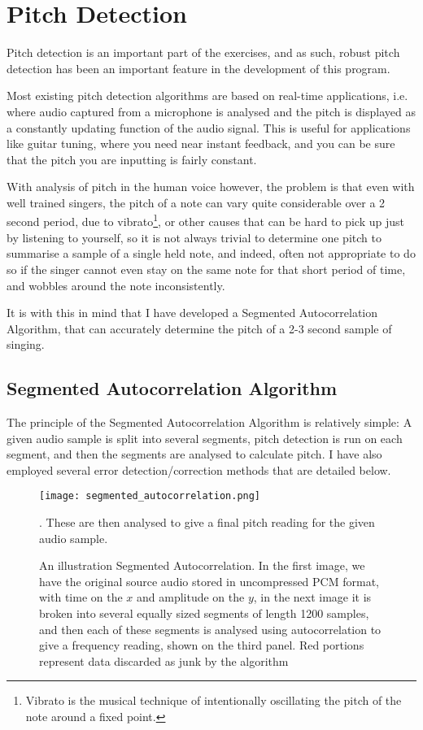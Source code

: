 \section{Pitch Detection}
\par Pitch detection is an important part of the exercises, and as such, robust pitch detection has been an important feature in the development of this program. 
\par Most existing pitch detection algorithms are based on real-time applications, i.e. where audio captured from a microphone is analysed and the pitch is displayed as a constantly updating function of the audio signal. This is useful for applications like guitar tuning, where you need near instant feedback, and you can be sure that the pitch you are inputting is fairly constant. 
\par With analysis of pitch in the human voice however, the problem is that even with well trained singers, the pitch of a note can vary quite considerable over a 2 second period, due to vibrato\footnote{Vibrato is the musical technique of intentionally oscillating the pitch of the note around a fixed point.}, or other causes that can be hard to pick up just by listening to yourself, so it is not always trivial to determine one pitch to summarise a sample of a single held note, and indeed, often not appropriate to do so if the singer cannot even stay on the same note for that short period of time, and wobbles around the note inconsistently.
\par It is with this in mind that I have developed a Segmented Autocorrelation Algorithm,  that can accurately determine the pitch of a 2-3 second sample of singing.

\subsection{Segmented Autocorrelation Algorithm}
The principle of the Segmented Autocorrelation Algorithm is relatively simple: A given audio sample is split into several segments, pitch detection is run on each segment, and then the segments are analysed to calculate pitch. I have also employed several error detection/correction methods that are detailed below.
\begin{figure}
	\centering
	\texttt{[image: segmented\_autocorrelation.png]}
	\caption{An illustration Segmented Autocorrelation. In the first image, we have the original source audio stored in uncompressed PCM format, with time on the \(x\) and amplitude on the \(y\), in the next image it is broken into several equally sized segments of length 1200 samples, and then each of these segments is analysed using autocorrelation to give a frequency reading, shown on the third panel. Red portions represent data discarded as junk by the algorithm}. These are then analysed to give a final pitch reading for the given audio sample.
\end{figure}


